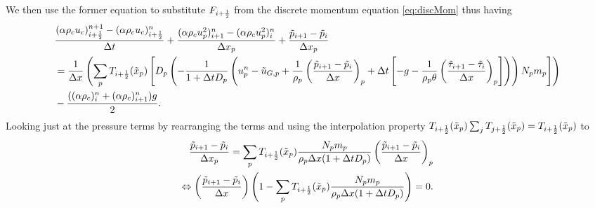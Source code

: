We then use the former equation to substitute $F_{i+\frac{1}{2}}$ from the discrete momentum equation \eqref{eq:discMom} thus having
\begin{align*}
    &\dfrac{(\alpha \rho_c u_c)_{i+\frac{1}{2}}^{n+1}- (\alpha \rho_c u_c)_{i+\frac{1}{2}}^{n}}{\Delta t} + \dfrac{(\alpha \rho_c u_p^2)^n_{i+1}-(\alpha \rho_c u_p^2)^n_{i}}{\Delta x_p} + \dfrac{\tilde{p}_{i+1}-\tilde{p}_i}{\Delta x_p} \\
    &= \dfrac{1}{\Delta x} \left( \sum_p T_{i+\frac{1}{2}} (\tilde{x}_p) \left[ D_p \left(- 
    \dfrac{1}{1 + \Delta t D_p} \left(
    u_p^n - \tilde{u}_{G,p} 
    + \dfrac{1}{\rho_p} \left(\dfrac{\tilde{p}_{i+1} - \tilde{p}_i}{\Delta x} \right)_p + \Delta t \left[ - g - \dfrac{1}{\rho_p \theta} \left( \dfrac{\tilde{\tau}_{i+1} - \tilde{\tau}_i}{\Delta x}\right)_p \right] \right) \right) N_p m_p \right] \right)\\
    &-\dfrac{((\alpha \rho_c)_i^n + (\alpha \rho_c)_{i+1}^n)g}{2}.
\end{align*}
Looking just at the pressure terms by rearranging the terms and using the interpolation property $T_{i+\frac{1}{2}} (\tilde{x}_p) \sum_j T_{j+\frac{1}{2}} (\tilde{x}_p) = T_{i+\frac{1}{2}} (\tilde{x}_p)$ to
\begin{align*}
    \dfrac{\tilde{p}_{i+1}-\tilde{p}_i}{\Delta x_p} = \sum_p T_{i+\frac{1}{2}} (\tilde{x}_p) \dfrac{N_p m_p}{\rho_p \Delta x (1 + \Delta t D_p)} \left( \dfrac{\tilde{p}_{i+1} - \tilde{p}_i}{\Delta x} \right)_p \\
\Leftrightarrow \left( \dfrac{\tilde{p}_{i+1} - \tilde{p}_i}{\Delta x} \right)
 \left( 1 - \sum_p T_{i+\frac{1}{2}} (\tilde{x}_p) \dfrac{N_p m_p}{\rho_p \Delta x (1 + \Delta t D_p)} \right) = 0.
\end{align*}


